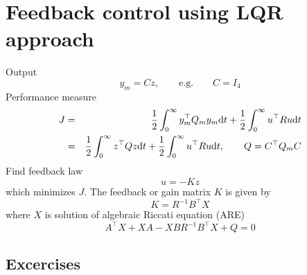 \documentclass[12pt]{article}
\begin{document}

\section{Feedback control using LQR approach}
Output
\[
y_m = C z, \qquad \textrm{e.g.} \qquad C = I_4
\]
Performance measure
\begin{eqnarray*}
J &=& \frac{1}{2}\int_0^\infty y_m^\top Q_m y_m \textrm{d} t + \frac{1}{2} \int_0^\infty u^\top R 
u \textrm{d} t \\
&=& \frac{1}{2}\int_0^\infty z^\top Q z \textrm{d} t + \frac{1}{2} \int_0^\infty u^\top R u \textrm{d}   
t , \qquad Q = C^\top Q_m C
\end{eqnarray*}
Find feedback law
\[
u = -K z
\]
which minimizes $J$. The feedback or gain matrix $K$ is given by
\[
K = R^{-1} B^\top X
\]
where $X$ is solution of algebraic Riccati equation (ARE)
\[
A^\top X + X A - X B R^{-1} B^\top X + Q = 0
\]

\subsection{Excercises}
\end{document}
